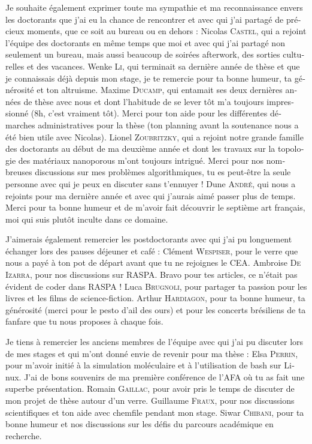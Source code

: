 \begin{otherlanguage}{french}
Je souhaite également exprimer toute ma sympathie et ma reconnaissance envers les doctorants que j'ai eu la chance de rencontrer et avec qui j'ai partagé de précieux moments, que ce soit au bureau ou en dehors :
Nicolas \textsc{Castel}, qui a rejoint l'équipe des doctorants en même temps que moi et avec qui j'ai partagé non seulement un bureau, mais aussi beaucoup de soirées afterwork, des sorties culturelles et des vacances.
Wenke \textsc{Li}, qui terminait sa dernière année de thèse et que je connaissais déjà depuis mon stage, je te remercie pour ta bonne humeur, ta générosité et ton altruisme.
Maxime \textsc{Ducamp}, qui entamait ses deux dernières années de thèse avec nous et dont l'habitude de se lever tôt m'a toujours impressionné (8h, c'est vraiment tôt). Merci pour ton aide pour les différentes démarches administratives pour la thèse (ton planning avant la soutenance nous a été bien utile avec Nicolas).
Lionel \textsc{Zoubritzky}, qui a rejoint notre grande famille des doctorants au début de ma deuxième année et dont les travaux sur la topologie des matériaux nanoporous m'ont toujours intrigué. Merci pour nos nombreuses discussions sur mes problèmes algorithmiques, tu es peut-être la seule personne avec qui je peux en discuter sans t'ennuyer !
Dune \textsc{André}, qui nous a rejoints pour ma dernière année et avec qui j'aurais aimé passer plus de temps. Merci pour ta bonne humeur et de m'avoir fait découvrir le septième art français, moi qui suis plutôt inculte dans ce domaine.

J'aimerais également remercier les postdoctorants avec qui j'ai pu longuement échanger lors des pauses déjeuner et café :
Clément \textsc{Wespiser}, pour le verre que nous a payé à ton pot de départ avant que tu ne rejoignes le CEA.
Ambroise \textsc{De Izarra}, pour nos discussions sur RASPA. Bravo pour tes articles, ce n'était pas évident de coder dans RASPA !
Luca \textsc{Brugnoli}, pour partager ta passion pour les livres et les films de science-fiction. 
Arthur \textsc{Hardiagon}, pour ta bonne humeur, ta générosité (merci pour le pesto d'ail des ours) et pour les concerts brésiliens de ta fanfare que tu nous proposes à chaque fois.

Je tiens à remercier les anciens membres de l'équipe avec qui j'ai pu discuter lors de mes stages et qui m'ont donné envie de revenir pour ma thèse :
Elsa \textsc{Perrin}, pour m'avoir initié à la simulation moléculaire et à l'utilisation de {\normalfont bash} sur {\normalfont Linux}. J'ai de bons souvenirs de ma première conférence de l'{\normalfont AFA} où tu as fait une superbe présentation.
Romain \textsc{Gaillac}, pour avoir pris le temps de discuter de mon projet de thèse autour d'un verre.
Guillaume \textsc{Fraux}, pour nos discussions scientifiques et ton aide avec {\normalfont chemfile} pendant mon stage.
Siwar \textsc{Chibani}, pour ta bonne humeur et nos discussions sur les défis du parcours académique en recherche.


\end{otherlanguage}
